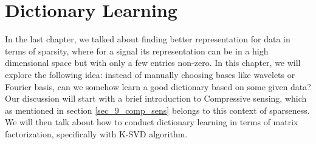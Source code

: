 \documentclass[../book-template.tex]{subfiles}
\begin{document}
\chapter{Dictionary Learning}
In the last chapter, we talked about finding better representation for data in terms of sparsity, where for a signal its representation can be in a high dimensional space but with only a few entries non-zero. In this chapter, we will explore the following idea: instead of manually choosing bases like wavelets or Fourier basis, can we somehow learn a good dictionary based on some given data? Our discussion will start with a brief introduction to Compressive sensing, which as mentioned in section \ref{sec_9_comp_sens} belongs to this context of sparseness. We will then talk about how to conduct dictionary learning in terms of matrix factorization, specifically with K-SVD algorithm.
\end{document}
